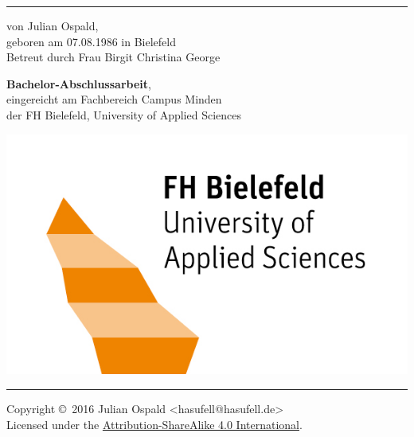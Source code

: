\begin{titlepage}
    \hrule
	\vspace*{3cm}
	\begin{center}
		{\Huge \sc \TitleFirstLine}

		\begin{Large}
			\vspace*{18pt}
			{\Large von Julian Ospald,\\
			geboren am 07.08.1986 in Bielefeld\\
			Betreut durch Frau Birgit Christina George}

			\vspace*{40pt}
			{\bf Bachelor-Abschlussarbeit},\\
			eingereicht am Fachbereich Campus Minden\\
			der FH Bielefeld, University of Applied Sciences\\
			
			\vspace*{20pt}
			\noindent{\today}
		\end{Large}
		
		\vspace*{40pt}
		\includegraphics[scale=1.0]{Content/TitlePage/fhbi_logo_kompakt_orange}\\


	\vfill
    \hrule
   	\vfill

    
    		Copyright \copyright \ 2016 Julian Ospald <hasufell@hasufell.de>\\
Licensed under the \href{https://creativecommons.org/licenses/by-sa/4.0/legalcode}{Attribution-ShareAlike 4.0 International}.
	\end{center}
\end{titlepage}
